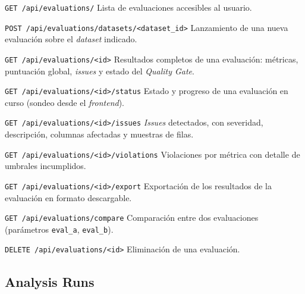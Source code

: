 \begin{definitionlist}
  \item[\texttt{GET /api/evaluations/}]  Lista de evaluaciones accesibles
    al usuario.

  \item[\texttt{POST /api/evaluations/datasets/<dataset\_id>}]  Lanzamiento
    de una nueva evaluación sobre el \emph{dataset} indicado.

  \item[\texttt{GET /api/evaluations/<id>}]  Resultados completos de una
    evaluación: métricas, puntuación global, \emph{issues} y estado del
    \emph{Quality Gate}.

  \item[\texttt{GET /api/evaluations/<id>/status}]  Estado y progreso de
    una evaluación en curso (sondeo desde el \emph{frontend}).

  \item[\texttt{GET /api/evaluations/<id>/issues}]  \emph{Issues}
    detectados, con severidad, descripción, columnas afectadas y muestras
    de filas.

  \item[\texttt{GET /api/evaluations/<id>/violations}]  Violaciones por
    métrica con detalle de umbrales incumplidos.

  \item[\texttt{GET /api/evaluations/<id>/export}]  Exportación de los
    resultados de la evaluación en formato descargable.

  \item[\texttt{GET /api/evaluations/compare}]  Comparación entre dos
    evaluaciones (parámetros \texttt{eval\_a}, \texttt{eval\_b}).

  \item[\texttt{DELETE /api/evaluations/<id>}]  Eliminación de una
    evaluación.
\end{definitionlist}

\subsection*{Analysis Runs}

